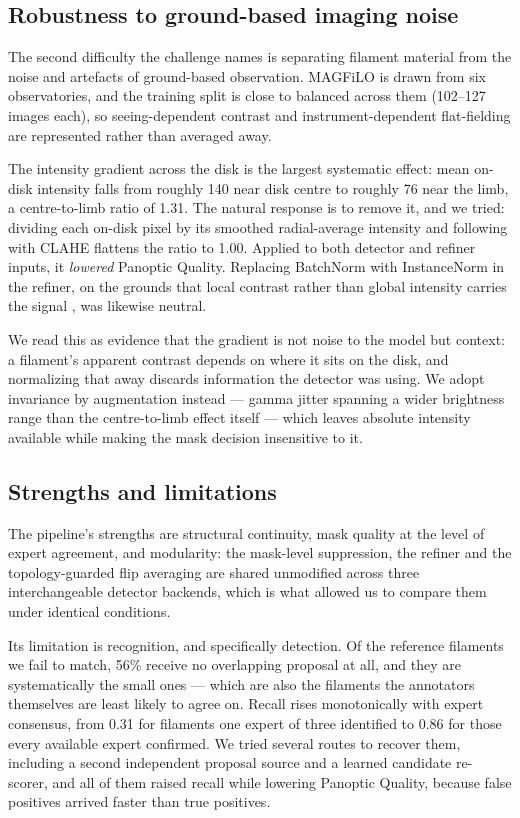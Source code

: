 \documentclass[sigconf]{acmart}
\begin{document}
\subsection{Robustness to ground-based imaging noise}
    The second difficulty the challenge names is separating filament material from the noise and artefacts of ground-based observation. MAGFiLO is drawn from six observatories, and the training split is close to balanced across them (102--127 images each), so seeing-dependent contrast and instrument-dependent flat-fielding are represented rather than averaged away.

    The intensity gradient across the disk is the largest systematic effect: mean on-disk intensity falls from roughly 140 near disk centre to roughly 76 near the limb, a centre-to-limb ratio of 1.31. The natural response is to remove it, and we tried: dividing each on-disk pixel by its smoothed radial-average intensity and following with CLAHE flattens the ratio to 1.00. Applied to both detector and refiner inputs, it \emph{lowered} Panoptic Quality. Replacing BatchNorm with InstanceNorm in the refiner, on the grounds that local contrast rather than global intensity carries the signal \cite{hu2026modernconvnet}, was likewise neutral.

    We read this as evidence that the gradient is not noise to the model but context: a filament's apparent contrast depends on where it sits on the disk, and normalizing that away discards information the detector was using. We adopt invariance by augmentation instead --- gamma jitter spanning a wider brightness range than the centre-to-limb effect itself --- which leaves absolute intensity available while making the mask decision insensitive to it.

\subsection{Strengths and limitations}
    The pipeline's strengths are structural continuity, mask quality at the level of expert agreement, and modularity: the mask-level suppression, the refiner and the topology-guarded flip averaging are shared unmodified across three interchangeable detector backends, which is what allowed us to compare them under identical conditions.

    Its limitation is recognition, and specifically detection. Of the reference filaments we fail to match, 56\% receive no overlapping proposal at all, and they are systematically the small ones --- which are also the filaments the annotators themselves are least likely to agree on. Recall rises monotonically with expert consensus, from 0.31 for filaments one expert of three identified to 0.86 for those every available expert confirmed. We tried several routes to recover them, including a second independent proposal source and a learned candidate re-scorer, and all of them raised recall while lowering Panoptic Quality, because false positives arrived faster than true positives.
\end{document}
